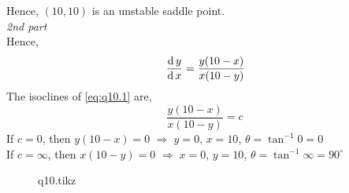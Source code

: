 \documentclass[../main-sheet.tex]{subfiles}
\begin{document}
\begin{soln}
    Hence, \((10,10)\) is an unstable saddle point.\\
    \emph{2nd part}\\
    Hence,
    \begin{equation}
        \,\frac{\mathrm{d}\,y}{\mathrm{d}\,x}=\frac{y(10-x)}{x(10-y)}\label{eq:q10.1}
    \end{equation}
    The isoclines of \eqref{eq:q10.1} are,
    \[\frac{y(10-x)}{x(10-y)}=c\]
    If \(c=0\), then \(y(10-x)=0\) \(\Rightarrow\;y=0,\,x=10\), \(\theta=\tan^{-1}0=0\)\\
    If \(c=\infty\), then \(x(10-y)=0\) \(\Rightarrow\;x=0,\,y=10\), \(\theta=\tan^{-1} \infty=90^{\circ}\)
    \begin{figure}[H]
        \centering
        {q10.tikz}
    \end{figure}
\end{soln}
\end{document}
